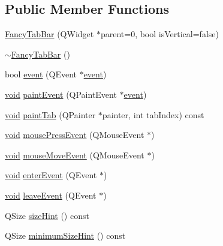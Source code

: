 \subsection*{\-Public \-Member \-Functions}
\begin{DoxyCompactItemize}
\item 
\hyperlink{group___core_plugin_gad575160a4e336a3039a99dc30bee15e3}{\-Fancy\-Tab\-Bar} (\-Q\-Widget $\ast$parent=0, bool is\-Vertical=false)
\item 
\hyperlink{group___core_plugin_ga5b40eca6caec361b4bc7f371468927dc}{$\sim$\-Fancy\-Tab\-Bar} ()
\item 
bool \hyperlink{group___core_plugin_ga61b546d0e4aa631e9b223a5da9358a31}{event} (\-Q\-Event $\ast$\hyperlink{group___core_plugin_ga61b546d0e4aa631e9b223a5da9358a31}{event})
\item 
\hyperlink{group___u_a_v_objects_plugin_ga444cf2ff3f0ecbe028adce838d373f5c}{void} \hyperlink{group___core_plugin_gacffef3ad6d0b595db42d532043ba064c}{paint\-Event} (\-Q\-Paint\-Event $\ast$\hyperlink{group___core_plugin_ga61b546d0e4aa631e9b223a5da9358a31}{event})
\item 
\hyperlink{group___u_a_v_objects_plugin_ga444cf2ff3f0ecbe028adce838d373f5c}{void} \hyperlink{group___core_plugin_gaf99f17cc16adc2741f28115358888282}{paint\-Tab} (\-Q\-Painter $\ast$painter, int tab\-Index) const 
\item 
\hyperlink{group___u_a_v_objects_plugin_ga444cf2ff3f0ecbe028adce838d373f5c}{void} \hyperlink{group___core_plugin_ga233783eaace38242dab543caa3081f7f}{mouse\-Press\-Event} (\-Q\-Mouse\-Event $\ast$)
\item 
\hyperlink{group___u_a_v_objects_plugin_ga444cf2ff3f0ecbe028adce838d373f5c}{void} \hyperlink{group___core_plugin_ga62d3b78d5a2de6843a7ccaaf82928113}{mouse\-Move\-Event} (\-Q\-Mouse\-Event $\ast$)
\item 
\hyperlink{group___u_a_v_objects_plugin_ga444cf2ff3f0ecbe028adce838d373f5c}{void} \hyperlink{group___core_plugin_gacd1e12691b9857f46777d7fdfe6d5cb2}{enter\-Event} (\-Q\-Event $\ast$)
\item 
\hyperlink{group___u_a_v_objects_plugin_ga444cf2ff3f0ecbe028adce838d373f5c}{void} \hyperlink{group___core_plugin_gabbbfe787a32c59bd8cd36a165d6a665d}{leave\-Event} (\-Q\-Event $\ast$)
\item 
\-Q\-Size \hyperlink{group___core_plugin_gac7cd7091fc9e84d116935f64f510d3b3}{size\-Hint} () const 
\item 
\-Q\-Size \hyperlink{group___core_plugin_gaf8f470f82a3959c7bdc7a98340148bba}{minimum\-Size\-Hint} () const 

\end{DoxyCompactItemize}

